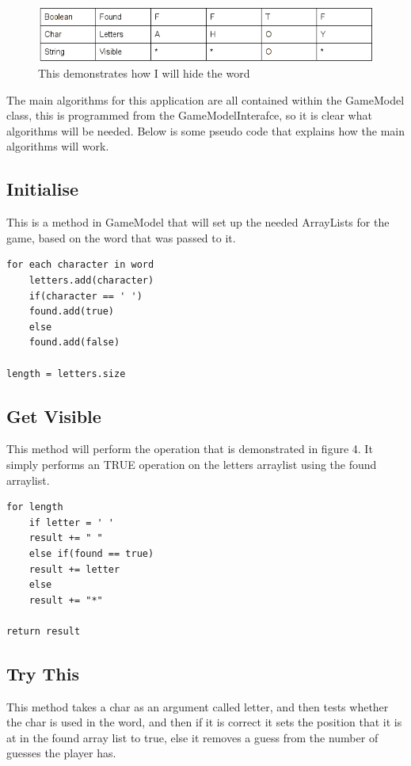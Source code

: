 \documentclass[notitlepage]{report}
\begin{document}
\begin{figure}[!htb]
  \centering
  \includegraphics[scale=0.5]{table}
  \caption{This demonstrates how I will hide the word}
  \label{fig:label}
\end{figure}

The main algorithms for this application are all contained within the GameModel class, this is programmed from the GameModelInterafce, so it is clear what algorithms will be needed. Below is some pseudo code that explains how the main algorithms will work.

\subsection{Initialise}
This is a method in GameModel that will set up the needed ArrayLists for the game, based on the word that was passed to it. 

\begin{lstlisting}
for each character in word 
    letters.add(character)
    if(character == ' ')
	found.add(true)
    else
	found.add(false)

length = letters.size
\end{lstlisting}

\subsection{Get Visible}
This method will perform the operation that is demonstrated in figure 4. It simply performs an TRUE operation on the letters arraylist using the found arraylist. 

\begin{lstlisting}
for length
    if letter = ' '
	result += " "
    else if(found == true)
	result += letter
    else
	result += "*"

return result
\end{lstlisting}
 

\subsection{Try This}
This method takes a char as an argument called letter, and then tests whether the char is used in the word, and then if it is correct it sets the position that it is at in the found array list to true, else it removes a guess from the number of guesses the player has. 
\end{document}
